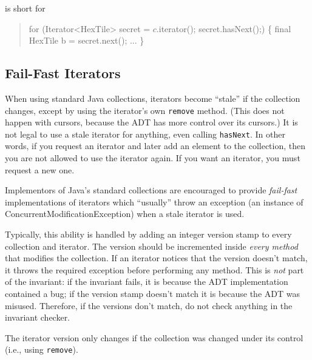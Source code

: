 \documentclass[11pt]{article}
\begin{document}
is short for
\begin{quote}
\begin{htmlonly}
\begin{alltt}
\end{htmlonly}
%begin{latexonly}
\begin{program}
%end{latexonly}
for (Iterator<HexTile> secret = $c$.iterator(); secret.hasNext();) \{
   final HexTile b = secret.next();
   ...
\}
%begin{latexonly}
\end{program}
%end{latexonly}
\begin{htmlonly}
\end{alltt}
\end{htmlonly}
\end{quote}

\subsection{Fail-Fast Iterators}

When using standard Java collections,
iterators become ``stale'' if the collection changes, except by using
the iterator's own \verb|remove| method.  (This does not happen with
cursors, because the ADT has more control over its cursors.)
It is not legal to
use a stale iterator for anything, even calling \verb|hasNext|.
In other words, if you request an iterator and later add an element to
the collection, then you are not allowed to use the iterator again.
If you want an iterator, you must request a new one.

Implementors of Java's standard 
collections are encouraged to provide \emph{fail-fast}
implementations of iterators which ``usually'' throw an exception
(an instance of \textsf{ConcurrentModificationException})
when a stale iterator is used.

Typically, this ability is handled by adding an integer version stamp to every
collection and iterator.  The version should be incremented inside \emph{every method} that
modifies the collection.  If an iterator notices that the version doesn't
match, it throws the required exception before performing any method.
This is \emph{not} part of the invariant: if the invariant fails, it
is because the ADT implementation contained a bug; if the version stamp doesn't match it
is because the ADT was misused. Therefore, if the versions don't
match, do not check anything in the invariant checker.

The iterator version only changes if the collection was changed under
its control (i.e., using \verb|remove|).
\end{document}
